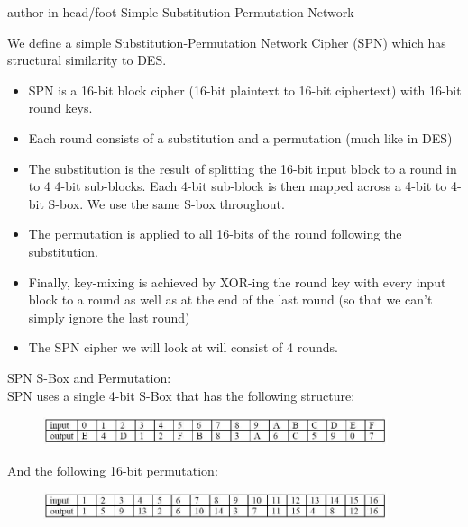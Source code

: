 \documentclass[9pt]{beamer}
\begin{document}
\begin{frame}
\begin{beamercolorbox}[ht=2.5ex,dp=1.125ex,center,rounded=true,shadow=true]{author in head/foot}
Simple Substitution-Permutation Network
\end{beamercolorbox}
\end{frame}

\begin{frame}
We define a simple Substitution-Permutation Network Cipher (SPN) which has structural similarity to DES.

\begin{itemize}
\item SPN is a 16-bit block cipher (16-bit plaintext to 16-bit ciphertext) with 16-bit round keys.
\item Each round consists of a substitution and a permutation (much like in DES)
\item The substitution is the result of splitting the 16-bit input block to a round in to 4 4-bit sub-blocks. Each 4-bit sub-block is then mapped across a 4-bit to 4-bit S-box. We use the same S-box throughout.
\item The permutation is applied to all 16-bits of the round following the substitution.
\item Finally, key-mixing is achieved by XOR-ing the round key with every input block to a round as well as at the end of the last round (so that we can't simply ignore the last round)
\item The SPN cipher we will look at will consist of 4 rounds.
\end{itemize}
\end{frame}

\begin{frame}
SPN S-Box and Permutation:\\
\vspace{5mm}
SPN uses a single 4-bit S-Box that has the following structure:
\begin{figure}
\includegraphics[width=0.9\textwidth]{spn_sbox.jpg}
\end{figure}

\vspace{5mm}
And the following 16-bit permutation:
\begin{figure}
\includegraphics[width=0.9\textwidth]{spn_perm.jpg}
\end{figure}

\vspace{5mm}

\end{frame}
\end{document}
